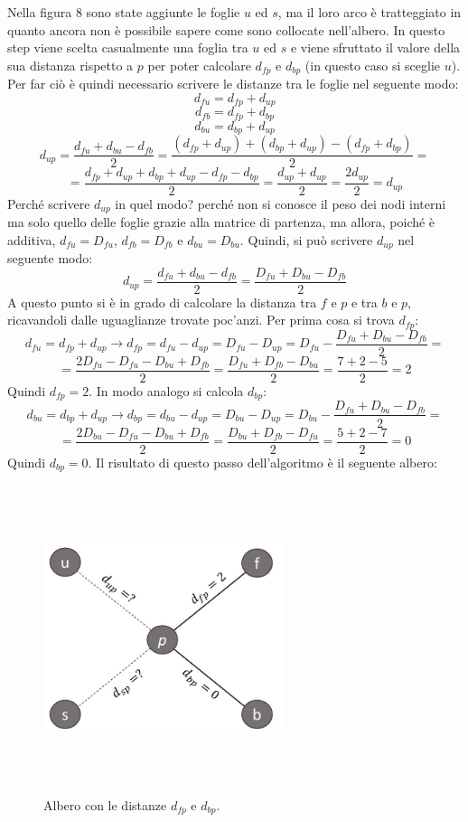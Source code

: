 \newline
Nella figura 8 sono state aggiunte le foglie $u$ ed $s$, ma il loro arco è tratteggiato in quanto ancora non è possibile sapere come sono collocate nell'albero.
\newline
In questo step viene scelta casualmente una foglia tra $u$ ed $s$ e viene sfruttato il valore della sua distanza rispetto a $p$ per poter calcolare $d_{fp}$ e $d_{bp}$ (in questo caso si sceglie $u$). Per far ciò è quindi necessario scrivere le distanze tra le foglie nel seguente modo:
\[d_{fu}=d_{fp}+d_{up}\]
\[d_{fb}=d_{fp}+d_{bp}\]
\[d_{bu}=d_{bp}+d_{up}\]
\[d_{up}=\frac{d_{fu}+d_{bu}-d_{fb}}2=
\frac{(d_{fp}+d_{up})+(d_{bp}+d_{up})-(d_{fp}+d_{bp})}2=\]
\[=\frac{d_{fp}+d_{up}+d_{bp}+d_{up}-d_{fp}-d_{bp}}2=
\frac{d_{up}+d_{up}}2=
\frac{2d_{up}}2=d_{up}
\]
Perché scrivere $d_{up}$ in quel modo? perché non si conosce il peso dei nodi interni ma solo quello delle foglie grazie alla matrice di partenza, ma allora, poiché è additiva, $d_{fu}=D_{fu}$, $d_{fb}=D_{fb}$ e $d_{bu}=D_{bu}$. Quindi, si può scrivere $d_{up}$ nel seguente modo:
\[d_{up}=\frac{d_{fu}+d_{bu}-d_{fb}}2=\frac{D_{fu}+D_{bu}-D_{fb}}2\]
A questo punto si è in grado di calcolare la distanza tra $f$ e $p$ e tra $b$ e $p$, ricavandoli dalle uguaglianze trovate poc'anzi. Per prima cosa si trova $d_{fp}$:
\[d_{fu}=d_{fp}+d_{up} \rightarrow d_{fp}=d_{fu}-d_{up}=D_{fu}-D_{up}=
D_{fu}-\frac{D_{fu}+D_{bu}-D_{fb}}2=\]
\[=\frac{2D_{fu}-D_{fu}-D_{bu}+D_{fb}}2=\frac{D_{fu}+D_{fb}-D_{bu}}2=
\frac{7+2-5}2=2\]
Quindi $d_{fp}=2$. In modo analogo si calcola $d_{bp}$:
\[d_{bu}=d_{bp}+d_{up} \rightarrow d_{bp}=d_{bu}-d_{up}=D_{bu}-D_{up}=
D_{bu}-\frac{D_{fu}+D_{bu}-D_{fb}}2=\]
\[=\frac{2D_{bu}-D_{fu}-D_{bu}+D_{fb}}2=\frac{D_{bu}+D_{fb}-D_{fu}}2=
\frac{5+2-7}2=0\]
Quindi $d_{bp}=0$. Il risultato di questo passo dell'algoritmo è il seguente albero:
\begin{figure}[h!]
\centering
	\includegraphics[height=9cm, width=7cm, keepaspectratio]{distance_between_f_b_part_3.jpg}
 	\caption{Albero con le distanze $d_{fp}$ e $d_{bp}$.}
  	\label{fig:neighborsleaves_3}
\end{figure}
